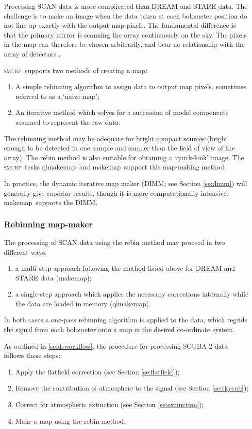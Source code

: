 \documentclass[twoside,11pt]{article}
\newcommand{\xref}[3]{#1}
\newcommand{\xlabel}[1]{}
\renewcommand{\_}{\texttt{\symbol{95}}}
\newcommand{\SMURF}{\textsc{smurf}}
\newcommand{\task}[1]{\textsf{#1}}
\newcommand{\qlmakemap}{\xref{\task{qlmakemap}}{sun258}{QLMAKEMAP}}
\newcommand{\makemap}{\xref{\task{makemap}}{sun258}{MAKEMAP}}
\begin{document}
Processing SCAN data is more complicated than DREAM and STARE data.
The challenge is to make an image when the data taken at each
bolometer position do not line up exactly with the output map
pixels. The fundamental difference is that the primary mirror is
scanning the array continuously on the sky. The pixels in the map can
therefore be chosen arbitrarily, and bear no relationship with the
array of detectors \cite{sc2ana001,sc2ana005,sc2ana006}.

\SMURF\ supports two methods of creating a map:
\begin{enumerate}
\item A simple rebinning algorithm to assign data to output map
  pixels, sometimes referred to as a `naive map';
\item An iterative method which solves for a succession of model
  components assumed to represent the raw data.
\end{enumerate}

The rebinning method may be adequate for bright compact sources
(bright enough to be detected in one sample and smaller than the field
of view of the array). The rebin method is also suitable for obtaining
a `quick-look' image. The \SMURF\ tasks \qlmakemap\ and \makemap\
support this map-making method.

In practice, the dynamic iterative map maker (DIMM; see Section
\ref{se:dimm}) will generally give superior results, though it is more
computationally intensive. \makemap\ supports the DIMM.

\subsubsection{\xlabel{rebin}Rebinning map-maker\label{se:rebin}}

The processing of SCAN data using the rebin method may proceed in two
different ways:
\begin{enumerate}
\item a multi-step approach following the method listed above for
  DREAM and STARE data (\makemap);
\item a single-step approach which applies the necessary
  corrections internally while the data are loaded in memory
  (\qlmakemap).
\end{enumerate}
In both cases a one-pass rebinning algorithm is applied to the data,
which regrids the signal from each bolometer onto a map in the desired
co-ordinate system.

As outlined in \ref{se:dsworkflow}, the procedure for processing
SCUBA-2 data follows these steps:
\begin{enumerate}
\item Apply the flatfield correction (see Section \ref{se:flatfield});
\item Remove the contribution of atmosphere to the signal (see Section
  \ref{se:skysub});
\item Correct for atmospheric extinction (see Section
  \ref{se:extinction});
\item Make a map using the rebin method.
\end{enumerate}
\end{document}
